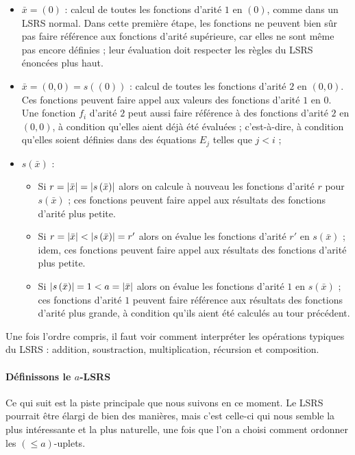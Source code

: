 \documentclass{report}
\newcommand{\leqa}{\left( \leqslant a \right)}
\begin{document}
	\begin{itemize}[itemsep=-1mm]
		\item 	$\bar{x} = (0)$ : calcul de toutes les fonctions d'arité $1$ en $(0)$, comme dans un LSRS normal. Dans cette première étape, les fonctions ne peuvent bien sûr pas faire référence aux fonctions d'arité supérieure, car elles ne sont même pas encore définies ; leur évaluation doit respecter les règles du LSRS énoncées plus haut. 
		\item 	$\bar{x} = (0,0) = s\left( \left( 0 \right)\right)$ : calcul de toutes les fonctions d'arité $2$ en $(0,0)$. Ces fonctions peuvent faire appel aux valeurs des fonctions d'arité $1$ en $0$. Une fonction $f_i$ d'arité $2$ peut aussi faire référence à des fonctions d'arité $2$ en $(0,0)$, à condition qu'elles aient déjà été évaluées ; c'est-à-dire, à condition qu'elles soient définies dans des équations $E_j$ telles que $j<i$ ;
		\item  	$s\left(\bar{x}\right)$ :
			\begin{itemize}[itemsep=-1mm]
				\item 	Si $r = \left|\bar{x}\right| = \left|s\left(\bar{x}\right)\right|$ alors on calcule à nouveau les fonctions d'arité $r$ pour $s\left(\bar{x}\right)$ ; ces fonctions peuvent faire appel aux résultats des fonctions d'arité plus petite. 
				\item 	Si $r = \left|\bar{x}\right| < \left|s\left(\bar{x}\right)\right| = r'$ alors on évalue les fonctions d'arité $r'$ en $s\left(\bar{x}\right)$ ; idem, ces fonctions peuvent faire appel aux résultats des fonctions d'arité plus petite.
				\item 	Si $\left|s\left(\bar{x}\right)\right| = 1 < a = \left|\bar{x}\right|$ alors on évalue les fonctions d'arité $1$ en $s\left(\bar{x}\right)$ ; ces fonctions d'arité $1$ peuvent faire référence aux résultats des fonctions d'arité plus grande, à condition qu'ils aient été calculés au tour précédent. 
			\end{itemize}
	\end{itemize}
	
	Une fois l'ordre compris, il faut voir comment interpréter les opérations typiques du LSRS : addition, soustraction, multiplication, récursion et composition.


		\paragraph{Définissons le $a$-LSRS}
		
		Ce qui suit est la piste principale que nous suivons en ce moment. Le LSRS pourrait être élargi de bien des manières, mais c'est celle-ci qui nous semble la plus intéressante et la plus naturelle, une fois que l'on a choisi comment ordonner les $\leqa$-uplets.
		
\end{document}
